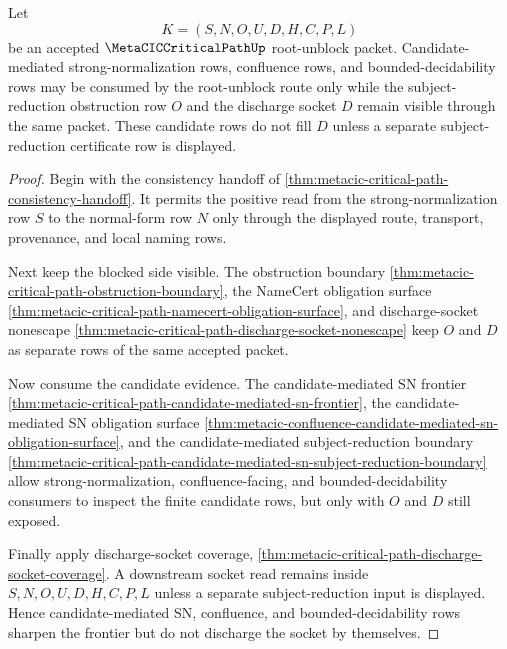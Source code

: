 \begin{theorem}
\label{thm:metacic-critical-path-candidate-discharge-frontier}
Let
$$
K=(S,N,O,U,D,H,C,P,L)
$$
be an accepted $\MetaCICCriticalPathUp$ root-unblock packet. Candidate-mediated strong-normalization rows, confluence rows, and bounded-decidability rows may be consumed by the root-unblock route only while the subject-reduction obstruction row $O$ and the discharge socket $D$ remain visible through the same packet. These candidate rows do not fill $D$ unless a separate subject-reduction certificate row is displayed.
\end{theorem}
\begin{proof}
Begin with the consistency handoff of \autoref{thm:metacic-critical-path-consistency-handoff}. It permits the positive read from the strong-normalization row $S$ to the normal-form row $N$ only through the displayed route, transport, provenance, and local naming rows.

Next keep the blocked side visible. The obstruction boundary \autoref{thm:metacic-critical-path-obstruction-boundary}, the NameCert obligation surface \autoref{thm:metacic-critical-path-namecert-obligation-surface}, and discharge-socket nonescape \autoref{thm:metacic-critical-path-discharge-socket-nonescape} keep $O$ and $D$ as separate rows of the same accepted packet.

Now consume the candidate evidence. The candidate-mediated SN frontier \autoref{thm:metacic-critical-path-candidate-mediated-sn-frontier}, the candidate-mediated SN obligation surface \autoref{thm:metacic-confluence-candidate-mediated-sn-obligation-surface}, and the candidate-mediated subject-reduction boundary \autoref{thm:metacic-critical-path-candidate-mediated-sn-subject-reduction-boundary} allow strong-normalization, confluence-facing, and bounded-decidability consumers to inspect the finite candidate rows, but only with $O$ and $D$ still exposed.

Finally apply discharge-socket coverage, \autoref{thm:metacic-critical-path-discharge-socket-coverage}. A downstream socket read remains inside $S,N,O,U,D,H,C,P,L$ unless a separate subject-reduction input is displayed. Hence candidate-mediated SN, confluence, and bounded-decidability rows sharpen the frontier but do not discharge the socket by themselves.
\end{proof}

